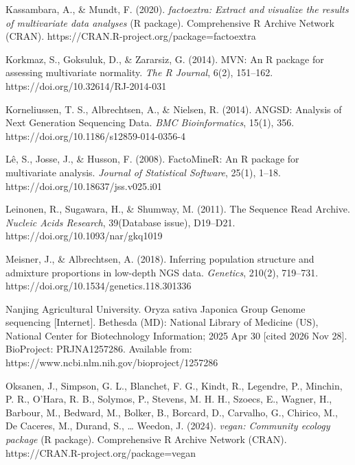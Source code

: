 \documentclass[12pt, a4paper]{article}
\begin{document}
\par\hangindent=0.5in
\noindent Kassambara, A., \& Mundt, F. (2020). \textit{factoextra: Extract and visualize the results of multivariate data analyses} (R package). Comprehensive R Archive Network (CRAN). https://CRAN.R-project.org/package=factoextra

\par\hangindent=0.5in
\noindent Korkmaz, S., Goksuluk, D., \& Zararsiz, G. (2014). MVN: An R package for assessing multivariate normality. \textit{The R Journal}, 6(2), 151--162. https://doi.org/10.32614/RJ-2014-031

\par\hangindent=0.5in
\noindent Korneliussen, T. S., Albrechtsen, A., \& Nielsen, R. (2014). ANGSD: Analysis of Next Generation Sequencing Data. \textit{BMC Bioinformatics}, 15(1), 356. https://doi.org/10.1186/s12859-014-0356-4

\par\hangindent=0.5in
\noindent L\^{e}, S., Josse, J., \& Husson, F. (2008). FactoMineR: An R package for multivariate analysis. \textit{Journal of Statistical Software}, 25(1), 1--18. https://doi.org/10.18637/jss.v025.i01

\par\hangindent=0.5in
\noindent Leinonen, R., Sugawara, H., \& Shumway, M. (2011). The Sequence Read Archive. \textit{Nucleic Acids Research}, 39(Database issue), D19--D21. https://doi.org/10.1093/nar/gkq1019

\par\hangindent=0.5in
\noindent Meisner, J., \& Albrechtsen, A. (2018). Inferring population structure and admixture proportions in low-depth NGS data. \textit{Genetics}, 210(2), 719--731. \\ https://doi.org/10.1534/genetics.118.301336

\par\hangindent=0.5in
\noindent Nanjing Agricultural University. Oryza sativa Japonica Group Genome sequencing [Internet]. Bethesda (MD): National Library of Medicine (US), National Center for Biotechnology Information; 2025 Apr 30 [cited 2026 Nov 28]. BioProject: PRJNA1257286. Available from: https://www.ncbi.nlm.nih.gov/bioproject/1257286

\par\hangindent=0.5in
\noindent Oksanen, J., Simpson, G. L., Blanchet, F. G., Kindt, R., Legendre, P., Minchin, P. R., O'Hara, R. B., Solymos, P., Stevens, M. H. H., Szoecs, E., Wagner, H., Barbour, M., Bedward, M., Bolker, B., Borcard, D., Carvalho, G., Chirico, M., De Caceres, M., Durand, S., \ldots{} Weedon, J. (2024). \textit{vegan: Community ecology package} (R package). Comprehensive R Archive Network (CRAN). https://CRAN.R-project.org/package=vegan
\end{document}
